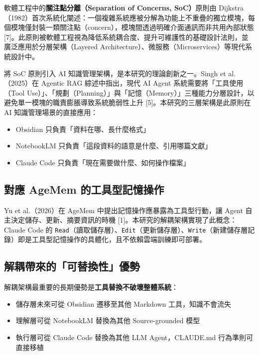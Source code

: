軟體工程中的\textbf{關注點分離（Separation of Concerns, SoC）}原則由
Dijkstra（1982）首次系統化闡述：一個複雜系統應被分解為功能上不重疊的獨立模塊，每個模塊僅封裝一類關注點（concern），模塊間透過明確介面通訊而非共用內部狀態
{[}7{]}。此原則被軟體工程視為降低系統耦合度、提升可維護性的基礎設計法則，並廣泛應用於分層架構（Layered
Architecture）、微服務（Microservices）等現代系統設計中。

將 SoC 原則引入 AI 知識管理架構，是本研究的理論創新之一。Singh et
al.（2025）在 Agentic RAG 綜述中指出，現代 AI Agent
系統需要將「工具使用（Tool
Use）」、「規劃（Planning）」與「記憶（Memory）」三種能力分層設計，以避免單一模塊的職責膨脹導致系統脆弱性上升
{[}5{]}。本研究的三層架構是此原則在 AI 知識管理場景的直接應用：

\begin{itemize}
\tightlist
\item
  Obsidian 只負責「資料在哪、長什麼格式」
\item
  NotebookLM 只負責「這段資料的語意是什麼、引用哪篇文獻」
\item
  Claude Code 只負責「現在需要做什麼、如何操作檔案」
\end{itemize}

\subsection{對應 AgeMem
的工具型記憶操作}\label{ux5c0dux61c9-agemem-ux7684ux5de5ux5177ux578bux8a18ux61b6ux64cdux4f5c}

Yu et al.（2026）在 AgeMem 中提出記憶操作應暴露為工具型行動，讓 Agent
自主決定儲存、更新、摘要資訊的時機
{[}1{]}。本研究的解耦架構實現了此概念：Claude Code 的
\texttt{Read}（讀取儲存層）、\texttt{Edit}（更新儲存層）、\texttt{Write}（新建儲存層記錄）即是工具型記憶操作的具體化，且不依賴雲端訓練即可部署。

\subsection{解耦帶來的「可替換性」優勢}\label{ux89e3ux8026ux5e36ux4f86ux7684ux53efux66ffux63dbux6027ux512aux52e2}

解耦架構最重要的長期優勢是\textbf{工具替換不破壞整體系統}：

\begin{itemize}
\tightlist
\item
  儲存層未來可從 Obsidian 遷移至其他 Markdown 工具，知識不會流失
\item
  理解層可從 NotebookLM 替換為其他 Source-grounded 模型
\item
  執行層可從 Claude Code 替換為其他 LLM Agent，CLAUDE.md
  行為準則可直接移植
\end{itemize}

